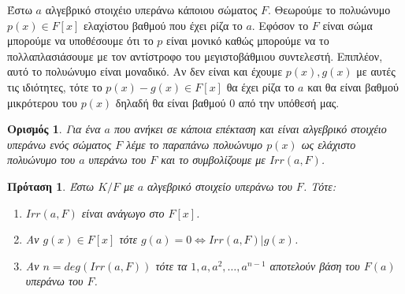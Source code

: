 \documentclass[oneside,a4paper]{article}
\newtheorem*{defn}{Ορισμός}
\newtheorem{prop}{Πρόταση}
\begin{document}
Έστω $a$ αλγεβρικό στοιχέιο υπεράνω κάποιου σώματος $F$. Θεωρούμε το πολυώνυμο $p(x) \in F[x]$ ελαχίστου βαθμού που έχει ρίζα το $a$. Εφόσον το $F$ είναι σώμα μπορούμε να υποθέσουμε ότι το $p$ είναι μονικό καθώς μπορούμε να το πολλαπλασιάσουμε με τον αντίστροφο του μεγιστοβάθμιου συντελεστή. Επιπλέον, αυτό το πολυώνυμο είναι μοναδικό. Αν δεν είναι και έχουμε $p(x), g(x)$ με αυτές τις ιδιότητες, τότε το $p(x)-g(x) \in F[x]$ θα έχει ρίζα το $a$ και θα είναι βαθμού μικρότερου του $p(x)$ δηλαδή θα είναι βαθμού 0 από την υπόθεσή μας.
\begin{defn} Για ένα $a$ που ανήκει σε κάποια επέκταση και είναι αλγεβρικό στοιχέιο υπεράνω ενός σώματος $F$ λέμε το παραπάνω πολυώνυμο $p(x)$ ως ελάχιστο πολυώνυμο του $a$ υπεράνω του $F$ και το συμβολίζουμε με $Irr(a,F)$. 
\end{defn}
\vspace{0.1cm}
\begin{prop}
	Έστω $K/F$ με $a$ αλγεβρικό στοιχείο υπεράνω του $F$. Τότε:
	\begin{enumerate}
		\item $Irr(a,F)$ είναι ανάγωγο στο $F[x]$.
		\item Αν $g(x) \in F[x]$ τότε $g(a) = 0 \iff Irr(a,F) | g(x)$.
		\item Αν $n = deg(Irr(a,F))$ τότε τα $1,a,a^2,\ldots,a^{n-1}$ αποτελούν βάση του $F(a)$ υπεράνω του $F$.
	\end{enumerate}
\end{prop}
\end{document}
